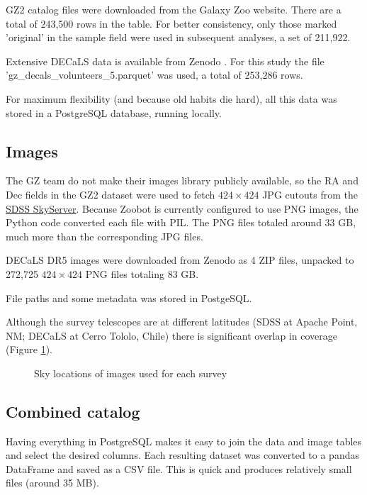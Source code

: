 \documentclass[preprint]{aastex631}
\begin{document}
GZ2 catalog files were downloaded from the Galaxy Zoo website.
There are a total of 243,500 rows in the table. For better consistency, only those marked 'original' in the sample field were used in subsequent analyses, a set of 211,922.

Extensive DECaLS data is available from Zenodo \citep{walmsley_mike_2020_4573248}. For this study the file 'gz\_decals\_volunteers\_5.parquet' was used, a total of 253,286 rows.

For maximum flexibility (and because old habits die hard), all this data was stored in a PostgreSQL database, running locally.

\subsection{Images} \label{images}

The GZ team do not make their images library publicly available, so the RA and Dec fields in the GZ2 dataset were used to fetch $424 \times 424$ JPG cutouts from the \href{http://skyserver.sdss.org/dr14/SkyServerWS/ImgCutout/getjpeg}{SDSS SkyServer}. Because Zoobot is currently configured to use PNG images, the Python code converted each file with PIL. The PNG files totaled around 33 GB, much more than the corresponding JPG files.

DECaLS DR5 images were downloaded from Zenodo \citep{walmsley_mike_2020_4573248} as 4 ZIP files, unpacked to 272,725 $424 \times 424$ PNG files totaling 83 GB. 

File paths and some metadata was stored in PostgeSQL.

Although the survey telescopes are at different latitudes (SDSS at Apache Point, NM; DECaLS at Cerro Tololo, Chile) there is significant overlap in coverage (Figure \ref{fig:coverage}).

\begin{figure}[htb!]
	\caption{Sky locations of images used for each survey
		\label{fig:coverage}}
\end{figure}



\subsection{Combined catalog}

Having everything in PostgreSQL makes it easy to join the data and image tables and select the desired columns. Each resulting dataset was converted to a pandas DataFrame and saved as a CSV file. This is quick and produces relatively small files (around 35 MB).
\end{document}

